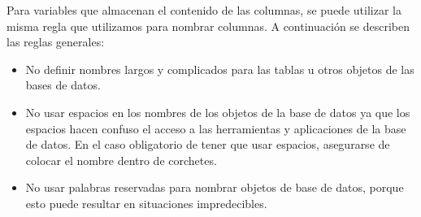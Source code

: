 Para variables que almacenan el contenido de las columnas, se puede utilizar la
misma regla que utilizamos para nombrar columnas. A continuación se describen
las reglas generales:

\begin{itemize}

\item No definir nombres largos y complicados para las tablas u otros objetos de
  las bases de datos.

\item No usar espacios en los nombres de los objetos de la base de datos ya que
  los espacios hacen confuso el acceso a las herramientas y aplicaciones de la
  base de datos. En el caso obligatorio de tener que usar espacios, asegurarse
  de colocar el nombre dentro de corchetes.

\item No usar palabras reservadas para nombrar objetos de base de datos, porque
  esto puede resultar en situaciones impredecibles.

\end{itemize}

\cleardoublepage

